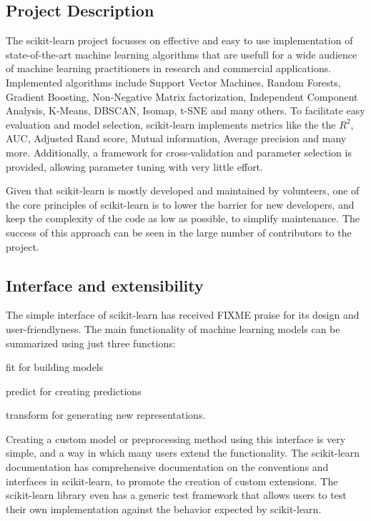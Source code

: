 \subsection{Project Description}
The scikit-learn project focusses on effective and easy to use implementation
of state-of-the-art machine learning algorithms that are usefull for a wide
audience of machine learning practitioners in research and commercial applications.
Implemented algorithms include Support Vector Machines, Random Forests, Gradient Boosting,
Non-Negative Matrix factorization, Independent Component Analysis, K-Means, DBSCAN, Isomap,
t-SNE and many others. To facilitate easy evaluation and model selection, scikit-learn
implements metrics like the the $R^2$, AUC, Adjusted Rand score, Mutual information, Average precision
and many more. Additionally, a framework for cross-validation and parameter selection is
provided, allowing parameter tuning with very little effort.

Given that scikit-learn is mostly developed and maintained by volunteers,
one of the core principles of scikit-learn is to lower the barrier for new developers,
and keep the complexity of the code as low as possible, to simplify maintenance.
The success of this approach can be seen in the large number of contributors to
the project.

\subsection{Interface and extensibility}
The simple interface of scikit-learn has received FIXME praise for its design and user-friendlyness.
The main functionality of machine learning models can be summarized using just three functions:

fit for building models

predict for creating predictions

transform for generating new representations.

Creating a custom model or preprocessing method using this interface is very simple,
and a way in which many users extend the functionality. The scikit-learn documentation
has comprehensive documentation on the conventions and interfaces in scikit-learn,
to promote the creation of custom extensions.
The scikit-learn library even has a generic test framework that allows users to
test their own implementation against the behavior expected by scikit-learn.

